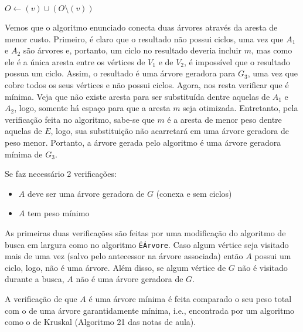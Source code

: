 \documentclass[a4paper]{report}
\begin{document}
\begin{algorithm}
    $O \gets \left( v \right) \cup  \left(  O \setminus (v)\right) $ \\
\end{algorithm}


Vemos que o algoritmo enunciado conecta duas árvores através da aresta de menor custo. Primeiro, é claro que o resultado não possui ciclos, uma vez que $A_1$ e $A_2$ são árvores e, portanto, um ciclo no resultado deveria incluir $m$, mas como ele é a única aresta entre os vértices de $V_1$ e de $V_2$, é impossível que o resultado possua um ciclo. Assim, o resultado é uma árvore geradora para $G_3$, uma vez que cobre todos os seus vértices e não possui ciclos. Agora, nos resta verificar que é mínima. Veja que não existe aresta para ser substituída dentre aquelas de $A_1$ e $A_2$, logo, somente há espaço para que a aresta $m$ seja otimizada. Entretanto, pela verificação feita no algoritmo, sabe-se que $m$ é a aresta de menor peso dentre aquelas de $E$, logo, sua substituição não acarretará em uma árvore geradora de peso menor. Portanto, a árvore gerada pelo algoritmo é uma árvore geradora mínima de $G_3$.


Se faz necessário 2 verificações:
\begin{itemize}
    \item $A$ deve ser uma árvore geradora de $G$ (conexa e sem ciclos)
    \item $A$ tem peso mínimo
\end{itemize}

As primeiras duas verificações são feitas por uma modificação do algoritmo de busca em largura como no algoritmo \texttt{ÉÁrvore}. Caso algum vértice seja visitado mais de uma vez (salvo pelo antecessor na árvore associada) então $A$ possui um ciclo, logo, não é uma árvore. Além disso, se algum vértice de $G$ não é visitado durante a busca, $A$ não é uma árvore geradora de $G$. 

A verificação de que $A$ é uma árvore mínima é feita comparado o seu peso total com o de uma árvore garantidamente mínima, i.e., encontrada por um algoritmo como o de Kruskal (Algoritmo 21 das notas de aula).
\end{document}
